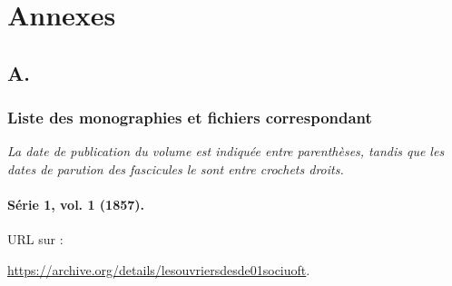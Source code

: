 \part*{Annexes}
\appendix
\renewcommand{\thechapter}{A}
\chapter{A. \lodm}

\section{Liste des monographies et fichiers correspondant}
\label{mapping}

\textit{La date de publication du volume est indiquée entre parenthèses, tandis que les dates de parution des fascicules le sont entre crochets droits.}

\subsection{Série 1, vol. 1 (1857).}

URL sur \ia{} : 

\url{https://archive.org/details/lesouvriersdesde01sociuoft}.

